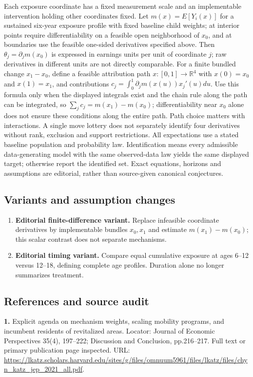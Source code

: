 \documentclass[11pt,a4paper]{article}
\newcommand{\R}{\mathbb R}
\begin{document}
Each exposure coordinate has a fixed measurement scale and an implementable intervention holding other coordinates fixed. Let \(m(x)=E[Y_i(x)]\) for a sustained six-year exposure profile with fixed baseline child weights; at interior points require differentiability on a feasible open neighborhood of \(x_0\), and at boundaries use the feasible one-sided derivatives specified above. Then \(\theta_j=\partial_jm(x_0)\) is expressed in earnings units per unit of coordinate \(j\); raw derivatives in different units are not directly comparable. For a finite bundled change \(x_1-x_0\), define a feasible attribution path \(x:[0,1]\to\R^4\) with \(x(0)=x_0\) and \(x(1)=x_1\), and contributions \(c_j=\int_0^1\partial_jm(x(u))x_j'(u)du\). Use this formula only when the displayed integrals exist and the chain rule along the path can be integrated, so \(\sum_jc_j=m(x_1)-m(x_0)\); differentiability near \(x_0\) alone does not ensure these conditions along the entire path. Path choice matters with interactions. A single move lottery does not separately identify four derivatives without rank, exclusion and support restrictions. All expectations use a stated baseline population and probability law. Identification means every admissible data-generating model with the same observed-data law yields the same displayed target; otherwise report the identified set. Exact equations, horizons and assumptions are editorial, rather than source-given canonical conjectures.
\subsection*{Variants and assumption changes}
\begin{enumerate}
\item \textbf{Editorial finite-difference variant.} Replace infeasible coordinate derivatives by implementable bundles \(x_0,x_1\) and estimate \(m(x_1)-m(x_0)\); this scalar contrast does not separate mechanisms.
\item \textbf{Editorial timing variant.} Compare equal cumulative exposure at ages 6–12 versus 12–18, defining complete age profiles. Duration alone no longer summarizes treatment.
\end{enumerate}
\subsection*{References and source audit}
\textbf{1.} Explicit agenda on mechanism weights, scaling mobility programs, and incumbent residents of revitalized areas. Locator: Journal of Economic Perspectives 35(4), 197–222; Discussion and Conclusion, pp.216–217. Full text or primary publication page inspected. URL: \url{https://lkatz.scholars.harvard.edu/sites/g/files/omnuum5961/files/lkatz/files/chyn_katz_jep_2021_all.pdf}.
\end{document}

